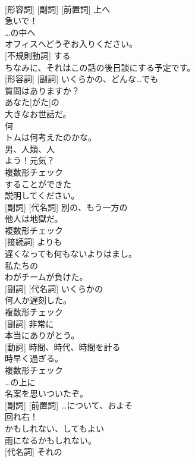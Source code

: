 \documentclass[8pt]{extreport}
\begin{document}
\begin{CJK}{UTF8}{min}
\\	[名詞] [形容詞] [副詞] [前置詞]	上へ	
\\	急いで！	
\\	[前置詞]	…の中へ	
\\	オフィスへどうぞお入りください。	
\\	[動詞] [不規則動詞]	する	
\\	ちなみに、それはこの話の後日談にする予定です。	
\\	[名詞] [形容詞] [副詞]	いくらかの、どんな…でも	
\\	質問はありますか？	
\\	[限定詞]	あなた[がた]の	
\\	大きなお世話だ。	
\\	[代名詞]	何	
\\	トムは何考えたのかな。	
\\	[名詞]	男、人類、人	
\\	よう！元気？	
\\	複数形チェック
\\	[助動詞]	することができた	
\\	説明してください。	
\\	[形容詞] [副詞] [代名詞]	別の、もう一方の	
\\	他人は地獄だ。	
\\	複数形チェック
\\	[前置詞] [接続詞]	よりも	
\\	遅くなっても何もないよりはまし。	
\\	[限定詞]	私たちの	
\\	わがチームが負けた。	
\\	[形容詞] [副詞] [代名詞]	いくらかの	
\\	何人か遅刻した。	
\\	複数形チェック
\\	[形容詞] [副詞]	非常に	
\\	本当にありがとう。	
\\	[名詞] [動詞]	時間、時代、時間を計る	
\\	時早く過ぎる。	
\\	複数形チェック
\\	[前置詞]	…の上に	
\\	名案を思いついたぞ。	
\\	[形容詞] [副詞] [前置詞]	…について、およそ	
\\	回れ右！	
\\	[助動詞]	かもしれない、してもよい	
\\	雨になるかもしれない。	
\\	[限定詞] [代名詞]	それの	

\end{CJK}
\end{document}

